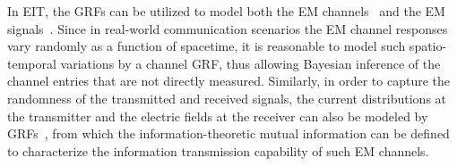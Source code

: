 \documentclass[journal,twocolumn]{IEEEtran}
\begin{document}
In EIT, the GRFs can be utilized to model both the EM channels~\cite{marzetta2022fourier} and the EM signals~\cite{wan2022mutual}. Since in real-world communication scenarios the EM channel responses vary randomly as a function of spacetime, it is reasonable to model such spatio-temporal variations by a channel GRF, thus allowing Bayesian inference of the channel entries that are not directly measured. 
Similarly, in order to capture the randomness of the transmitted and received signals, the current distributions at the transmitter and the electric fields at the receiver can also be modeled by GRFs~\cite{wan2022mutual}, from which the information-theoretic mutual information can be defined to characterize the information transmission capability of such EM channels. 



\end{document}
